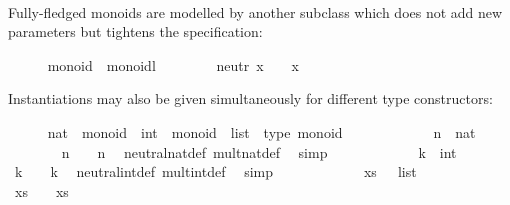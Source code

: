 \begin{isabellebody}
\isanewline
\ \ \ \ \isamarkupfalse%
%
\endisatagproof
{\isafoldproof}%
%
\isadelimproof
%
\endisadelimproof
%
\begin{isamarkuptext}%
\noindent Fully-fledged monoids are modelled by another subclass
  which does not add new parameters but tightens the specification:%
\end{isamarkuptext}%
\isamarkuptrue%
\ \ \ \ \isamarkupfalse%
\ monoid\ {\isacharequal}\ monoidl\ {\isacharplus}\isanewline
\ \ \ \ \ \ \ neutr{\isacharcolon}\ {\isachardoublequoteopen}x\ {\isasymotimes}\ {\isasymone}\ {\isacharequal}\ x{\isachardoublequoteclose}%
\begin{isamarkuptext}%
\noindent Instantiations may also be given simultaneously for different
  type constructors:%
\end{isamarkuptext}%
\isamarkuptrue%
\ \ \ \ \isamarkupfalse%
\ nat\ {\isacharcolon}{\isacharcolon}\ monoid\ \ int\ {\isacharcolon}{\isacharcolon}\ monoid\ \ list\ {\isacharcolon}{\isacharcolon}\ {\isacharparenleft}type{\isacharparenright}\ monoid\isanewline
%
\isadelimproof
\ \ \ \ %
\endisadelimproof
%
\isatagproof
{}\isamarkupfalse%
\isanewline
\ \ \ \ \ \ \isamarkupfalse%
\ n\ {\isacharcolon}{\isacharcolon}\ nat\isanewline
\ \ \ \ \ \ \isamarkupfalse%
\ {\isachardoublequoteopen}n\ {\isasymotimes}\ {\isasymone}\ {\isacharequal}\ n{\isachardoublequoteclose}\ \isamarkupfalse%
\ neutral{\isacharunderscore}nat{\isacharunderscore}def\ mult{\isacharunderscore}nat{\isacharunderscore}def\ \isamarkupfalse%
\ simp\isanewline
\ \ \ \ \isamarkupfalse%
\isanewline
\ \ \ \ \ \ \isamarkupfalse%
\ k\ {\isacharcolon}{\isacharcolon}\ int\isanewline
\ \ \ \ \ \ \isamarkupfalse%
\ {\isachardoublequoteopen}k\ {\isasymotimes}\ {\isasymone}\ {\isacharequal}\ k{\isachardoublequoteclose}\ \isamarkupfalse%
\ neutral{\isacharunderscore}int{\isacharunderscore}def\ mult{\isacharunderscore}int{\isacharunderscore}def\ \isamarkupfalse%
\ simp\isanewline
\ \ \ \ \isamarkupfalse%
\isanewline
\ \ \ \ \ \ \isamarkupfalse%
\ xs\ {\isacharcolon}{\isacharcolon}\ {\isachardoublequoteopen}{\isasymalpha}\ list{\isachardoublequoteclose}\isanewline
\ \ \ \ \ \ \isamarkupfalse%
\ {\isachardoublequoteopen}xs\ {\isasymotimes}\ {\isasymone}\ {\isacharequal}\ xs{\isachardoublequoteclose}\isanewline

\end{isabellebody}
